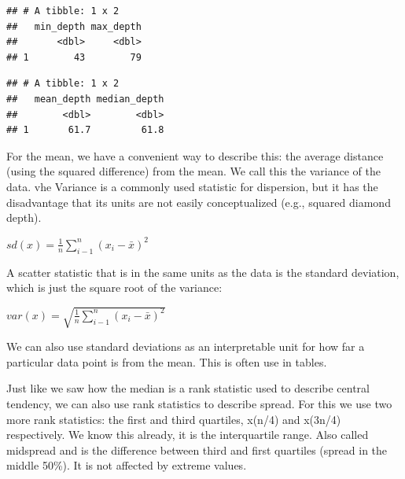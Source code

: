 \documentclass[
]{book}
\newenvironment{Shaded}{\begin{snugshade}}{\end{snugshade}}
\newcommand{\AttributeTok}[1]{\textcolor[rgb]{0.77,0.63,0.00}{#1}}
\newcommand{\CommentTok}[1]{\textcolor[rgb]{0.56,0.35,0.01}{\textit{#1}}}
\newcommand{\FunctionTok}[1]{\textcolor[rgb]{0.00,0.00,0.00}{#1}}
\newcommand{\NormalTok}[1]{#1}
\newcommand{\SpecialCharTok}[1]{\textcolor[rgb]{0.00,0.00,0.00}{#1}}
\begin{document}
\begin{Shaded}
\end{Shaded}

\begin{verbatim}
## # A tibble: 1 x 2
##   min_depth max_depth
##       <dbl>     <dbl>
## 1        43        79
\end{verbatim}

\begin{Shaded}
\end{Shaded}

\begin{verbatim}
## # A tibble: 1 x 2
##   mean_depth median_depth
##        <dbl>        <dbl>
## 1       61.7         61.8
\end{verbatim}

For the mean, we have a convenient way to describe this: the average distance (using the squared difference) from the mean. We call this the variance of the data. vhe Variance is a commonly used statistic for dispersion, but it has the disadvantage that its units are not easily conceptualized (e.g., squared diamond depth).

\(sd(x) = \frac{1}{n} \sum_{i-1}^n (x_i-\bar{x})^2\)

A scatter statistic that is in the same units as the data is the standard deviation, which is just the square root of the variance:

\(var(x) = \sqrt{\frac{1}{n} \sum_{i-1}^n (x_i-\bar{x})^2}\)

We can also use standard deviations as an interpretable unit for how far a particular data point is from the mean. This is often use in tables.

Just like we saw how the median is a rank statistic used to describe central tendency, we can also use rank statistics to describe spread.
For this we use two more rank statistics: the first and third quartiles, x(n/4) and x(3n/4) respectively. We know this already, it is the interquartile range. Also called midspread and is the difference between third and first quartiles (spread in the middle 50\%).
It is not affected by extreme values.
\end{document}
